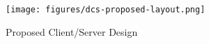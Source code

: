 \documentclass[11pt]{article}
\begin{document}
    \begin{figure}[H]
      \centering
      \texttt{[image: figures/dcs-proposed-layout.png]}
      \caption{Proposed Client/Server Design}\label{fig:layout-proposed-dcs}
    \end{figure}








\end{document}
